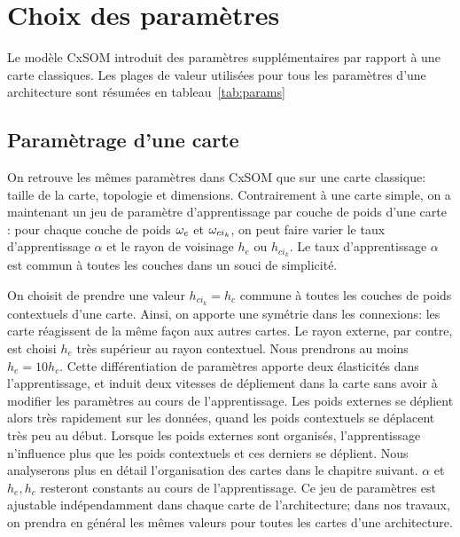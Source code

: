 \section{Choix des paramètres}\label{sec:params}

Le modèle CxSOM introduit des paramètres supplémentaires par rapport à une carte classiques. Les plages de valeur utilisées pour tous les paramètres d'une architecture sont résumées en tableau~\ref{tab:params}
\subsection{Paramètrage d'une carte}
On retrouve les mêmes paramètres dans CxSOM que sur une carte classique: taille de la carte, topologie et dimensions. 
Contrairement à une carte simple, on a maintenant un jeu de paramètre d'apprentissage par couche de poids d'une carte : pour chaque couche de poids $\omega_e$ et $\omega_{ci_k}$, on peut faire varier le taux d'apprentissage $\alpha$ et le rayon de voisinage $h_e$ ou $h_{ci_k}$. Le taux d'apprentissage $\alpha$ est commun à toutes les couches dans un souci de simplicité.

On choisit de prendre une valeur $h_{ci_k} = h_c$ commune à toutes les couches de poids contextuels d'une carte. Ainsi, on apporte une symétrie dans les connexions: les carte réagissent de la même façon aux autres cartes. Le rayon externe, par contre, est choisi $h_e$ très supérieur au rayon contextuel. Nous prendrons au moins $h_e = 10 h_c$. Cette différentiation de paramètres apporte deux élasticités dans l'apprentissage, et induit deux vitesses de dépliement dans la carte sans avoir à modifier les paramètres au cours de l'apprentissage. Les poids externes se déplient alors très rapidement sur les données, quand les poids contextuels se déplacent très peu au début. Lorsque les poids externes sont organisés, l'apprentissage n'influence plus que les poids contextuels et ces derniers se déplient. Nous analyserons plus en détail l'organisation des cartes dans le chapitre suivant.
$\alpha$ et $h_e, h_c$ resteront constants au cours de l'apprentissage.
Ce jeu de paramètres est ajustable indépendamment dans chaque carte de l'architecture; dans nos travaux, on prendra en général les mêmes valeurs pour toutes les cartes d'une architecture.

